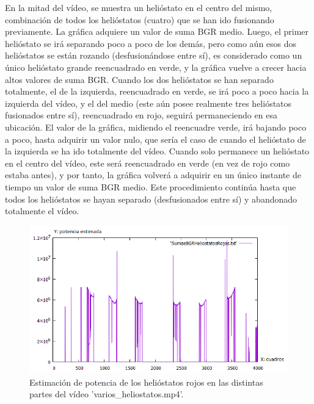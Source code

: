 En la mitad del vídeo, se muestra un helióstato en el centro del mismo, combinación de todos los helióstatos (cuatro) que se han ido fusionando previamente. La gráfica adquiere un valor de suma BGR medio. Luego, el primer helióstato se irá separando poco a poco de los demás, pero como aún esos dos helióstatos se están rozando (desfusionándose entre sí), es considerado como un único helióstato grande reencuadrado en verde, y la gráfica vuelve a crecer hacia altos valores de suma BGR. Cuando los dos helióstatos se han separado totalmente, el de la izquierda, reencuadrado en verde, se irá poco a poco hacia la izquierda del vídeo, y el del medio (este aún posee realmente tres helióstatos fusionados entre sí), reencuadrado en rojo, seguirá permaneciendo en esa ubicación. El valor de la gráfica, midiendo el reencuadre verde, irá bajando poco a poco, hasta adquirir un valor nulo, que sería el caso de cuando el helióstato de la izquierda se ha ido totalmente del vídeo. Cuando solo permanece un helióstato en el centro del vídeo, este será reencuadrado en verde (en vez de rojo como estaba antes), y por tanto, la gráfica volverá a adquirir en un único instante de tiempo un valor de suma BGR medio. Este procedimiento continúa hasta que todos los helióstatos se hayan separado (desfusionados entre sí) y abandonado totalmente el vídeo.\\[20pt]

\begin{figure}[h!]
  	\centering
	\includegraphics[width=\textwidth]{ValidacionCualitativaFuncionEstimacionPotencia/SumasBGRHeliostatosRojosVideo1.png}
	\caption{Estimación de potencia de los helióstatos rojos en las distintas partes del vídeo 'varios\_heliostatos.mp4'.
	\label{fig:ValidacionCualitativaFuncionEstimacionPotencia/SumasBGRHeliostatosRojosVideo1.png}}
\end{figure}

